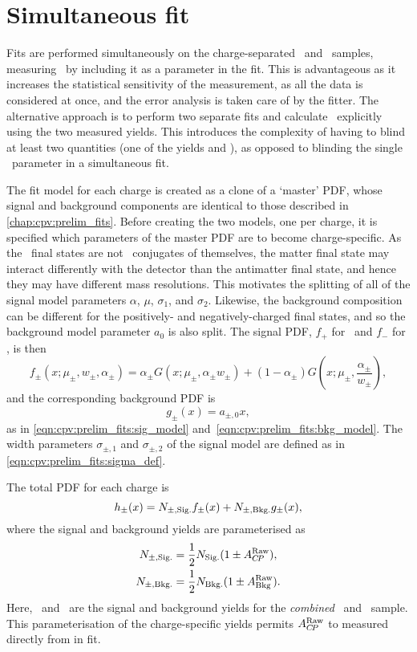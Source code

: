 \section{Simultaneous fit}
\label{chap:cpv:araw:simultaneous_fit}

Fits are performed simultaneously on the charge-separated \PLambdac\ and 
\APLambdac\ samples, measuring \ARaw\ by including it as a parameter in the 
fit.
This is advantageous as it increases the statistical sensitivity of the 
measurement, as all the data is considered at once, and the error analysis is 
taken care of by the fitter.
The alternative approach is to perform two separate fits and calculate \ARaw\ 
explicitly using the two measured yields.
This introduces the complexity of having to blind at least two quantities (one 
of the yields and \ARaw), as opposed to blinding the single \ARaw\ parameter in 
a simultaneous fit.

The fit model for each charge is created as a clone of a `master' \ac{PDF}, 
whose signal and background components are identical to those described in 
\cref{chap:cpv:prelim_fits}.
Before creating the two models, one per charge, it is specified which 
parameters of the master \ac{PDF} are to become charge-specific.
As the \PLambdac\ final states are not \CP\ conjugates of themselves, the 
matter final state may interact differently with the detector than the 
antimatter final state, and hence they may have different mass resolutions.
This motivates the splitting of all of the signal model parameters $\alpha$, 
$\mu$, $\sigma_{1}$, and $\sigma_{2}$.
Likewise, the background composition can be different for the positively- and 
negatively-charged final states, and so the background model parameter $a_{0}$ 
is also split.
The signal \ac{PDF}, $f_{+}$ for \PLambdac\ and $f_{-}$ for \APLambdac, is then
\begin{equation}
  f_{\pm}(x; \mu_{\pm}, w_{\pm}, \alpha_{\pm}) =
    \alpha_{\pm}{}G(x; \mu_{\pm}, \alpha_{\pm}w_{\pm}) +
    (1 - \alpha_{\pm})G(x; \mu_{\pm}, \frac{\alpha_{\pm}}{w_{\pm}}),
\end{equation}
and the corresponding background \ac{PDF} is
\begin{equation}
  g_{\pm}(x) = a_{\pm,0}x,
\end{equation}
as in \cref{eqn:cpv:prelim_fits:sig_model} 
and~\cref{eqn:cpv:prelim_fits:bkg_model}.
The width parameters $\sigma_{\pm, 1}$ and  $\sigma_{\pm, 2}$ of the signal 
model are defined as in \cref{eqn:cpv:prelim_fits:sigma_def}.

The total \ac{PDF} for each charge is
\begin{equation}
  h_{\pm}(x) = N_{\pm,\text{Sig.}} f_{\pm}(x) + N_{\pm,\text{Bkg.}} g_{\pm}(x),
\end{equation}
where the signal and background yields are parameterised as
\begin{align}
  N_{\pm,\text{Sig.}} &= \frac{1}{2}N_{\text{Sig.}}(1 \pm A_{C\!P}^{\textnormal{Raw}}),\\
  N_{\pm,\text{Bkg.}} &= \frac{1}{2}N_{\text{Bkg.}}(1 \pm A_{\textnormal{Bkg}}^{\textnormal{Raw}}).
\end{align}
Here, \nsig\ and \nbkg\ are the signal and background yields for the 
\emph{combined} \PLambdac\ and \APLambdac\ sample.
This parameterisation of the charge-specific yields permits $A_{C\!P}^{\textnormal{Raw}}$ to measured 
directly from in fit.

